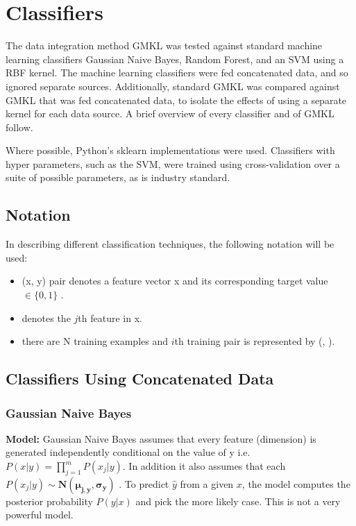 \documentclass{article}
\begin{document}
\section*{Classifiers}

The data integration method GMKL was tested against standard machine learning
classifiers Gaussian Naive Bayes, Random Forest, and an SVM using a RBF kernel.
The machine learning classifiers were fed concatenated data, and so ignored
separate sources. Additionally, standard GMKL was compared against GMKL that
was fed concatenated data, to isolate the effects of using a separate kernel
for each data source. A brief overview of every classifier and of GMKL follow.

Where possible, Python's sklearn implementations were used. Classifiers with
hyper parameters, such as the SVM, were trained using cross-validation over a
suite of possible parameters, as is industry standard.

\subsection*{Notation}
In describing different classification techniques, the following notation will
be used:
\begin{itemize}
\setlength\itemsep{0em}
\item (x, y) pair denotes a feature vector x \mmin {} and its
    corresponding target value $\in \{0, 1\}$ .
\item {} denotes the $j$th feature in x.
\item there are N training examples and $i$th training pair is represented by
    (,  ).
\end{itemize}


\subsection*{Classifiers Using Concatenated Data}

\subsubsection*{Gaussian Naive Bayes}
\textbf{Model:}
Gaussian Naive Bayes assumes that every feature (dimension)  is
generated independently conditional on the value of y i.e. $P(x|y) =
\prod_{j=1}^{m} P(x_j|y)$. In addition it also assumes that each $P(x_j|y) \sim
\mathbf{N(\mu_{j,y}, \sigma_y)}$ . To predict $\hat{y}$ from a given $x$, the
model computes the posterior probability $P(y|x)$ and pick the more likely
case. This is not a very powerful model.
\end{document}
